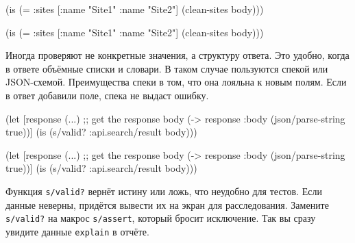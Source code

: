 \ifx\DEVICETYPE\MOBILE

\begin{english}
  \begin{clojure}
(is (= {:sites [{:name "Site1"}
                {:name "Site2"}]}
       (clean-sites body)))
  \end{clojure}
\end{english}

\else

\begin{english}
  \begin{clojure}
(is (= {:sites [{:name "Site1"} {:name "Site2"}]}
       (clean-sites body)))
  \end{clojure}
\end{english}

\fi

Иногда проверяют не конкретные значения, а структуру ответа. Это удобно, когда в
ответе объёмные списки и словари. В таком случае пользуются спекой или
JSON-схемой. Преимущества спеки в том, что она лояльна к новым полям. Если в
ответ добавили поле, спека не выдаст ошибку.


\ifx\DEVICETYPE\MOBILE

\begin{english}
  \begin{clojure}
(let [response (...) ;; get the response
      body (-> response
               :body
               (json/parse-string
                 true))]
  (is (s/valid? :api.search/result
                body)))
  \end{clojure}
\end{english}

\else

\begin{english}
  \begin{clojure}
(let [response (...) ;; get the response
      body (-> response :body (json/parse-string true))]
  (is (s/valid? :api.search/result body)))
  \end{clojure}
\end{english}

\fi

Функция \verb|s/valid?| вернёт истину или ложь, что неудобно для тестов. Если
данные неверны, придётся вывести их на экран для расследования. Замените
\verb|s/valid?| на макрос \verb|s/assert|, который бросит исключение. Так
вы сразу увидите данные \verb|explain| в отчёте.


